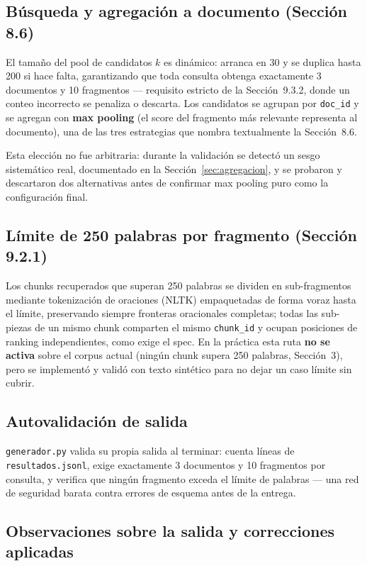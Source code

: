 \documentclass[11pt]{article}
\newcommand{\codigo}[1]{\texttt{\small #1}}
\begin{document}
\subsection{Búsqueda y agregación a documento (Sección 8.6)}

El tamaño del pool de candidatos $k$ es dinámico: arranca en 30 y se duplica
hasta 200 si hace falta, garantizando que toda consulta obtenga exactamente
3 documentos y 10 fragmentos --- requisito estricto de la Sección~9.3.2,
donde un conteo incorrecto se penaliza o descarta. Los candidatos se agrupan
por \codigo{doc\_id} y se agregan con \textbf{max pooling} (el score del
fragmento más relevante representa al documento), una de las tres
estrategias que nombra textualmente la Sección~8.6.

Esta elección no fue arbitraria: durante la validación se detectó un sesgo
sistemático real, documentado en la Sección~\ref{sec:agregacion}, y se
probaron y descartaron dos alternativas antes de confirmar max pooling puro
como la configuración final.

\subsection{Límite de 250 palabras por fragmento (Sección 9.2.1)}

Los chunks recuperados que superan 250 palabras se dividen en sub-fragmentos
mediante tokenización de oraciones (NLTK) empaquetadas de forma voraz hasta
el límite, preservando siempre fronteras oracionales completas; todas las
sub-piezas de un mismo chunk comparten el mismo \codigo{chunk\_id} y ocupan
posiciones de ranking independientes, como exige el spec. En la práctica
esta ruta \textbf{no se activa} sobre el corpus actual (ningún chunk supera
250 palabras, Sección~3), pero se implementó y validó con texto sintético
para no dejar un caso límite sin cubrir.

\subsection{Autovalidación de salida}

\codigo{generador.py} valida su propia salida al terminar: cuenta líneas de
\codigo{resultados.jsonl}, exige exactamente 3 documentos y 10 fragmentos por
consulta, y verifica que ningún fragmento exceda el límite de palabras ---
una red de seguridad barata contra errores de esquema antes de la entrega.

\subsection{Observaciones sobre la salida y correcciones aplicadas}
\label{sec:observaciones}
\end{document}
